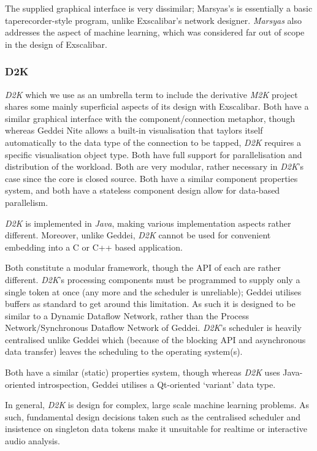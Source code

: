 The supplied graphical interface is very dissimilar; Marsyas's is essentially a basic taperecorder-style program, unlike Exscalibar's network designer. \textit{Marsyas} also addresses the aspect of machine learning, which was considered far out of scope in the design of Exscalibar.

\subsubsection{D2K}

\textit{D2K} which we use as an umbrella term to include the derivative \textit{M2K} project shares some mainly superficial aspects of its design with Exscalibar. Both have a similar graphical interface with the component/connection metaphor, though whereas Geddei Nite allows a built-in visualisation that taylors itself automatically to the data type of the connection to be tapped, \textit{D2K} requires a specific visualisation object type. Both have full support for parallelisation and distribution of the workload. Both are very modular, rather necessary in \textit{D2K}'s case since the core is closed source. Both have a similar component properties system, and both have a stateless component design allow for data-based parallelism.

\textit{D2K} is implemented in \textit{Java}, making various implementation aspects rather different. Moreover, unlike Geddei, \textit{D2K} cannot be used for convenient embedding into a C or C++ based application.

Both constitute a modular framework, though the API of each are rather different. \textit{D2K}'s processing components must be programmed to supply only a single token at once (any more and the scheduler is unreliable); Geddei utilises buffers as standard to get around this limitation. As such it is designed to be similar to a Dynamic Dataflow Network, rather than the Process Network/Synchronous Dataflow Network of Geddei. \textit{D2K}'s scheduler is heavily centralised unlike Geddei which (because of the blocking API and asynchronous data transfer) leaves the scheduling to the operating system(s).

Both have a similar (static) properties system, though whereas \textit{D2K} uses Java-oriented introspection, Geddei utilises a Qt-oriented `variant' data type.

In general, \textit{D2K} is design for complex, large scale machine learning problems. As such, fundamental design decisions taken such as the centralised scheduler and insistence on singleton data tokens make it unsuitable for realtime or interactive audio analysis.

